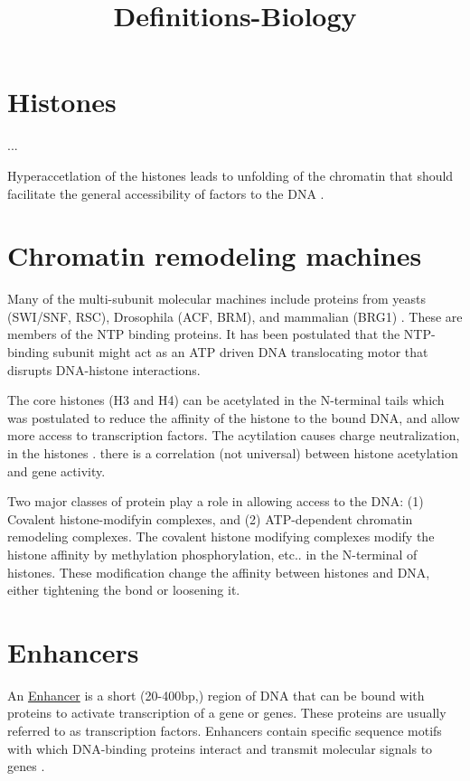 \documentclass[12pt]{paper}
\begin{document}
\title{Definitions-Biology}
\maketitle
\section{Histones}
...

Hyperaccetlation of the histones leads to unfolding of the chromatin that should facilitate the general accessibility of factors to the DNA \cite{Blackwood98}.

\section{Chromatin remodeling machines}
Many of the multi-subunit molecular machines include proteins from yeasts (SWI/SNF, RSC), Drosophila (ACF, BRM), and mammalian (BRG1) \cite{kadonaga1998eukaryotic}. These are members of the NTP binding proteins. It has been postulated that the NTP-binding subunit might act as an ATP driven DNA translocating motor that disrupts DNA-histone interactions. 

The core histones (H3 and H4) can be acetylated in the N-terminal tails which was postulated to reduce the affinity of the histone to the bound DNA, and allow more access to transcription factors. The acytilation causes charge neutralization, in the histones \cite{kadonaga1998eukaryotic}. there is a correlation (not universal) between histone acetylation and gene activity. 

Two major classes of protein play a role in allowing access to the DNA: (1) Covalent histone-modifyin complexes, and (2) ATP-dependent chromatin remodeling complexes.
The covalent histone modifying complexes modify the histone affinity by methylation phosphorylation, etc.. in the N-terminal of histones. These modification change the affinity between histones and DNA, either tightening the bond or loosening it. 

\section{Enhancers}
 An \href{http://en.wikipedia.org/wiki/Enhancer_(genetics)}{Enhancer} is a short (20-400bp,\cite{Kulaeva12}) region of DNA that can be bound with proteins to activate transcription of a gene or genes. These proteins are usually referred to as transcription factors. Enhancers contain  specific sequence motifs with which DNA-binding proteins interact and transmit molecular signals to genes \cite{Blackwood98}.
\end{document}
